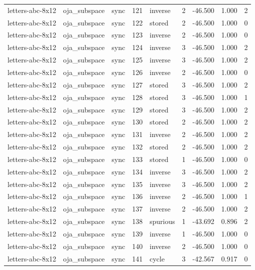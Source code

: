 \begin{tabular}{lllrlrrrr}
letters-abc-8x12 & oja\_subspace & sync & 121 & inverse & 2 & -46.500 & 1.000 & 2 \\
letters-abc-8x12 & oja\_subspace & sync & 122 & stored & 2 & -46.500 & 1.000 & 0 \\
letters-abc-8x12 & oja\_subspace & sync & 123 & inverse & 2 & -46.500 & 1.000 & 0 \\
letters-abc-8x12 & oja\_subspace & sync & 124 & inverse & 3 & -46.500 & 1.000 & 2 \\
letters-abc-8x12 & oja\_subspace & sync & 125 & inverse & 3 & -46.500 & 1.000 & 2 \\
letters-abc-8x12 & oja\_subspace & sync & 126 & inverse & 2 & -46.500 & 1.000 & 0 \\
letters-abc-8x12 & oja\_subspace & sync & 127 & stored & 3 & -46.500 & 1.000 & 2 \\
letters-abc-8x12 & oja\_subspace & sync & 128 & stored & 3 & -46.500 & 1.000 & 1 \\
letters-abc-8x12 & oja\_subspace & sync & 129 & stored & 3 & -46.500 & 1.000 & 2 \\
letters-abc-8x12 & oja\_subspace & sync & 130 & stored & 2 & -46.500 & 1.000 & 2 \\
letters-abc-8x12 & oja\_subspace & sync & 131 & inverse & 2 & -46.500 & 1.000 & 2 \\
letters-abc-8x12 & oja\_subspace & sync & 132 & stored & 2 & -46.500 & 1.000 & 2 \\
letters-abc-8x12 & oja\_subspace & sync & 133 & stored & 1 & -46.500 & 1.000 & 0 \\
letters-abc-8x12 & oja\_subspace & sync & 134 & inverse & 3 & -46.500 & 1.000 & 2 \\
letters-abc-8x12 & oja\_subspace & sync & 135 & inverse & 3 & -46.500 & 1.000 & 2 \\
letters-abc-8x12 & oja\_subspace & sync & 136 & inverse & 2 & -46.500 & 1.000 & 1 \\
letters-abc-8x12 & oja\_subspace & sync & 137 & inverse & 2 & -46.500 & 1.000 & 2 \\
letters-abc-8x12 & oja\_subspace & sync & 138 & spurious & 1 & -43.692 & 0.896 & 2 \\
letters-abc-8x12 & oja\_subspace & sync & 139 & inverse & 1 & -46.500 & 1.000 & 0 \\
letters-abc-8x12 & oja\_subspace & sync & 140 & inverse & 2 & -46.500 & 1.000 & 0 \\
letters-abc-8x12 & oja\_subspace & sync & 141 & cycle & 3 & -42.567 & 0.917 & 0 \\

\end{tabular}
